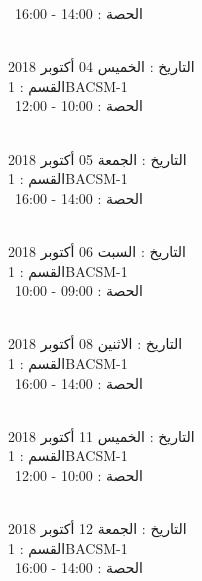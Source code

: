  \  
الحصة : 14:00 - 16:00 \\
\par
\noindent\makebox[\linewidth]{\rule{\paperwidth}{0.4pt}}
 \\
التاريخ : الخميس 04 أكتوبر 2018 \\
القسم : 1BACSM-1 \\
 \  
الحصة : 10:00 - 12:00 \\
\par
\noindent\makebox[\linewidth]{\rule{\paperwidth}{0.4pt}}
 \\
التاريخ : الجمعة 05 أكتوبر 2018 \\
القسم : 1BACSM-1 \\
 \  
الحصة : 14:00 - 16:00 \\
\par
\noindent\makebox[\linewidth]{\rule{\paperwidth}{0.4pt}}
 \\
التاريخ : السبت 06 أكتوبر 2018 \\
القسم : 1BACSM-1 \\
 \  
الحصة : 09:00 - 10:00 \\
\par
\noindent\makebox[\linewidth]{\rule{\paperwidth}{0.4pt}}
 \\
التاريخ : الاثنين 08 أكتوبر 2018 \\
القسم : 1BACSM-1 \\
 \  
الحصة : 14:00 - 16:00 \\
\par
\noindent\makebox[\linewidth]{\rule{\paperwidth}{0.4pt}}
 \\
التاريخ : الخميس 11 أكتوبر 2018 \\
القسم : 1BACSM-1 \\
 \  
الحصة : 10:00 - 12:00 \\
\par
\noindent\makebox[\linewidth]{\rule{\paperwidth}{0.4pt}}
 \\
التاريخ : الجمعة 12 أكتوبر 2018 \\
القسم : 1BACSM-1 \\
 \  
الحصة : 14:00 - 16:00 \\
\par
\noindent\makebox[\linewidth]{\rule{\paperwidth}{0.4pt}}
 \\

